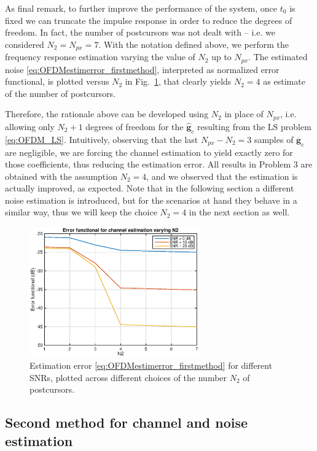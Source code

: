 \documentclass[10pt]{article}
\begin{document}
As final remark, to further improve the performance of the system, once $t_0$ is fixed we can truncate the impulse response in order to reduce the degrees of freedom. In fact, the number of postcursors was not dealt with -- i.e. we considered $N_2 \! = \! N_{px} \! = \! 7$. With the notation defined above, we perform the frequency response estimation varying the value of $N_2$ up to $N_{px}$. The estimated noise \eqref{eq:OFDMestimerror_firstmethod}, interpreted as normalized error functional, is plotted versus $N_2$ in Fig.~\ref{fig:OFDM_chooseN2}, that clearly yields $N_2 = 4$ as estimate of the number of postcursors.

Therefore, the rationale above can be developed using $N_2$ in place of $N_{px}$, i.e. allowing only $N_2 + 1$ degrees of freedom for the $\mathbf{\hat{g}}_c$ resulting from the LS problem \eqref{eq:OFDM_LS}. Intuitively, observing that the last $N_{px} \! - \! N_2 \! = \! 3$ samples of $\mathbf{g}_c$ are negligible, we are forcing the channel estimation to yield exactly zero for those coefficients, thus reducing the estimation error. All results in Problem 3 are obtained with the assumption $N_2 = 4$, and we observed that the estimation is actually improved, as expected. Note that in the following section a different noise estimation is introduced, but for the scenarios at hand they behave in a similar way, thus we will keep the choice $N_2 = 4$ in the next section as well.

\begin{figure}
	\centering
	\includegraphics[width = 0.65\textwidth]{OFDM_chooseN2}
	\caption{Estimation error \eqref{eq:OFDMestimerror_firstmethod} for different SNRs, plotted across different choices of the number $N_2$ of postcursors.}
	\label{fig:OFDM_chooseN2}
\end{figure}


\subsection*{Second method for channel and noise estimation}
\end{document}
